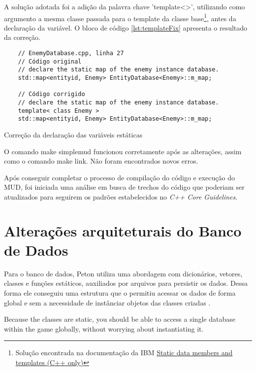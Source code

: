 A solução adotada foi a adição da palavra chave 'template<>', utilizando como argumento a mesma 
classe passada para o template da classe base\footnote{Solução encontrada na documentação da IBM 
\href{https://www.ibm.com/docs/en/zos/2.4.0?topic=only-static-data-members-templates-c}
{Static data members and templates (C++ only)}}, antes da declaração da variável. 
O bloco de código \ref{lst:templateFix} apresenta o resultado da correção.

\begin{listing}[!ht]
    \begin{verbatim}
    // EnemyDatabase.cpp, linha 27
    // Código original
    // declare the static map of the enemy instance database.
    std::map<entityid, Enemy> EntityDatabase<Enemy>::m_map;

    // Código corrigido
    // declare the static map of the enemy instance database.
    template< class Enemy >
    std::map<entityid, Enemy> EntityDatabase<Enemy>::m_map;
    \end{verbatim}
\caption{Correção da declaração das variáveis estáticas}
\label{lst:templateFix}
\end{listing}

O comando make simplemud funcionou corretamente após as alterações, assim como o comando make link.
Não foram encontrados novos erros.

Após conseguir completar o processo de compilação do código e execução do MUD, 
foi iniciada uma análise em busca de trechos do código que poderiam ser atualizados
para seguirem os padrões estabelecidos no \textit{C++ Core Guidelines}.


\section{Alterações arquiteturais do Banco de Dados}

Para o banco de dados, Peton utiliza uma abordagem com dicionários, vetores, classes e funções estáticos, 
auxiliados por arquivos para persistir os dados. Dessa forma ele conseguiu uma estrutura que o 
permitiu acessar os dados de forma global e sem a necessidade de instânciar objetos das classes 
criadas \cite{penton2003mud}.

\begin{citacao}
    Because the classes are static, you should be able to access
    a single database within the game globally, without
    worrying about instantiating it.\cite{penton2003mud}
\end{citacao}

